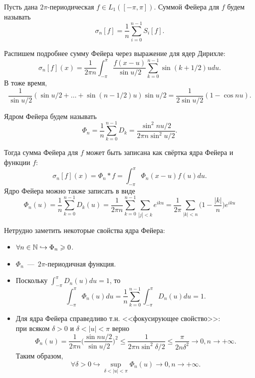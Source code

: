 \begin{definition}
    Пусть дана $2\pi$-периодическая $f \in L_1([-\pi, \pi])$. Суммой Фейера для $f$ будем называть \[
                                                                                                       \sigma_n[f] = \dfrac{1}{n}\sum\limits_{i = 0}^{n - 1} S_i[f].
    \]
\end{definition}
Распишем подробнее сумму Фейера через выражение для ядер Дирихле:
\[\sigma_n[f](x) = \dfrac{1}{2\pi n}\int_{-\pi}^{\pi} \dfrac{f(x  - u)}{\sin u/2}\sum\limits_{k = 0}^{n - 1} \sin (k + 1/2)u du.\]
В тоже время, \[
                  \dfrac{1}{\sin u/2}(\sin u/2 + \ldots + \sin (n - 1/2)u)\sin u/2 = \dfrac{1}{2\sin u/2}(1 -\cos nu).
\]
\begin{definition}
    Ядром Фейера будем называть \[
                                    \Phi_n = \dfrac{1}{n}\sum\limits_{k = 0}^{n - 1}D_k = \dfrac{\sin^2 nu/2}{2\pi n \sin^2 u/2}.
    \]
\end{definition}
Тогда сумма Фейера для $f$ может быть записана как свёртка ядра Фейера и функции $f$: \[
                                                                                          \sigma_n[f](x) = \Phi_n * f = \int_{-\pi}^{\pi} \Phi_n(x- u)f(u)du.
\]
Ядро Фейера можно также записать в виде \[
                                            \Phi_n(u) = \dfrac{1}{n}\sum\limits_{k = 0}^{n - 1}D_k(u) = \dfrac{1}{2\pi n}\sum\limits_{k = 0}^{n - 1}\sum\limits_{|j| < k} e^{iku} = \dfrac{1}{2\pi}\sum\limits_{|k| < n} \biggr(1 - \dfrac{|k|}{n}\biggr)e^{iku}
\]
\begin{proposition}
    Нетрудно заметить некоторые свойства ядра Фейера:
    \begin{itemize}
        \item $\forall n \in \mathbb{N} \hookrightarrow\Phi_n \geqslant 0$.
        \item $\Phi_n$~---~$2\pi$-периодичная функция.
        \item Поскольку $\int_{-\pi}^{\pi}D_n(u)du = 1$, то \[
                                                                \int_{-\pi}^{\pi} \Phi_n(u)du = \dfrac{1}{n}\sum\limits_{k = 0}^{n - 1}\int_{-\pi}^{\pi} D_n(u)du = 1.
        \]
        \item Для ядра Фейера справедливо т.н. <<фокусирующее свойство>>: \\ при всяком $\delta > 0$ и $\delta < |u| < \pi$ верно
        \[
            \Phi_n(u) = \dfrac{1}{2\pi n}\biggr(\dfrac{\sin nu/2}{\sin u/2}\biggr)^2 \leq \dfrac{1}{2\pi n \sin^2 \delta /2} \leq \dfrac{\pi}{2n\delta^2} \rightarrow 0, n \rightarrow +\infty.
        \]
        Таким образом, \[
                           \forall \delta > 0 \hookrightarrow \sup\limits_{\delta < |u| < \pi} \Phi_n(u) \rightarrow 0, n \rightarrow +\infty.
        \]
    \end{itemize}
\end{proposition}
